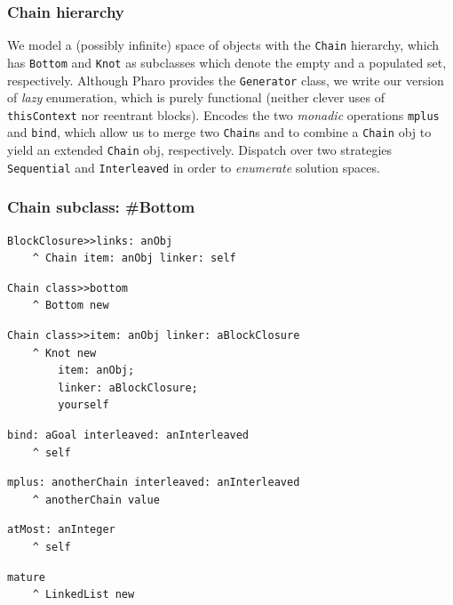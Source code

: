 \documentclass[9pt]{beamer}
\begin{document}
\begin{frame}[fragile]
\frametitle{Chain hierarchy}
We model a (possibly infinite) space of objects with the
\verb|Chain| hierarchy, which has \verb|Bottom| and \verb|Knot|
as subclasses which denote the empty and a populated set, respectively.
\vfill
Although Pharo provides the \verb|Generator| class, we write our version of
\textit{lazy} enumeration, which is purely functional (neither clever uses of
\verb|thisContext| nor reentrant blocks).
\vfill
Encodes the two \textit{monadic} operations \verb|mplus| and \verb|bind|,
which allow us to merge two \verb|Chain|s and to combine a \verb|Chain| obj
to yield an extended \verb|Chain| obj, respectively.
\vfill
Dispatch over two strategies \verb|Sequential| and \verb|Interleaved| in
order to \textit{enumerate} solution spaces.
\end{frame}

\begin{frame}[fragile]
\frametitle{Chain subclass: \#Bottom}

\begin{verbatim}
BlockClosure>>links: anObj
    ^ Chain item: anObj linker: self
\end{verbatim}
\begin{verbatim}
Chain class>>bottom
    ^ Bottom new
\end{verbatim}
\begin{verbatim}
Chain class>>item: anObj linker: aBlockClosure
    ^ Knot new
        item: anObj;
        linker: aBlockClosure;
        yourself
\end{verbatim}
\begin{verbatim}
bind: aGoal interleaved: anInterleaved
    ^ self
\end{verbatim}
\begin{verbatim}
mplus: anotherChain interleaved: anInterleaved
    ^ anotherChain value
\end{verbatim}
\begin{verbatim}
atMost: anInteger
    ^ self
\end{verbatim}
\begin{verbatim}
mature
    ^ LinkedList new
\end{verbatim}
\end{frame}
\end{document}
